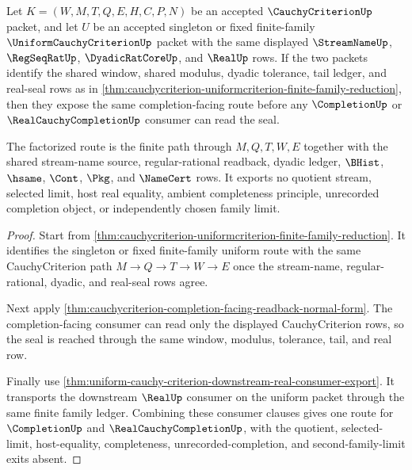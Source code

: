 \begin{theorem}
\label{thm:cauchycriterion-completion-uniform-family-factorization}
Let $K=(W,M,T,Q,E,H,C,P,N)$ be an accepted $\CauchyCriterionUp$ packet, and let $U$ be an accepted singleton or fixed finite-family $\UniformCauchyCriterionUp$ packet with the same displayed $\StreamNameUp$, $\RegSeqRatUp$, $\DyadicRatCoreUp$, and $\RealUp$ rows. If the two packets identify the shared window, shared modulus, dyadic tolerance, tail ledger, and real-seal rows as in \autoref{thm:cauchycriterion-uniformcriterion-finite-family-reduction}, then they expose the same completion-facing route before any $\CompletionUp$ or $\RealCauchyCompletionUp$ consumer can read the seal.

The factorized route is the finite path through $M,Q,T,W,E$ together with the shared stream-name source, regular-rational readback, dyadic ledger, $\BHist$, $\hsame$, $\Cont$, $\Pkg$, and $\NameCert$ rows. It exports no quotient stream, selected limit, host real equality, ambient completeness principle, unrecorded completion object, or independently chosen family limit.
\end{theorem}
\begin{proof}
Start from \autoref{thm:cauchycriterion-uniformcriterion-finite-family-reduction}. It identifies the singleton or fixed finite-family uniform route with the same CauchyCriterion path $M\to Q\to T\to W\to E$ once the stream-name, regular-rational, dyadic, and real-seal rows agree.

Next apply \autoref{thm:cauchycriterion-completion-facing-readback-normal-form}. The completion-facing consumer can read only the displayed CauchyCriterion rows, so the seal is reached through the same window, modulus, tolerance, tail, and real row.

Finally use \autoref{thm:uniform-cauchy-criterion-downstream-real-consumer-export}. It transports the downstream $\RealUp$ consumer on the uniform packet through the same finite family ledger. Combining these consumer clauses gives one route for $\CompletionUp$ and $\RealCauchyCompletionUp$, with the quotient, selected-limit, host-equality, completeness, unrecorded-completion, and second-family-limit exits absent.
\end{proof}

